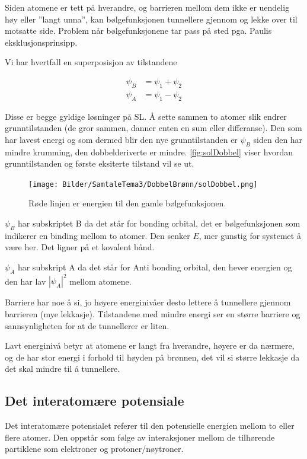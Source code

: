 Siden atomene er tett på hverandre, og barrieren mellom dem ikke er uendelig høy eller ''langt unna'', kan bølgefunksjonen tunnellere gjennom og lekke over til motsatte side. Problem når bølgefunksjonene tar pass på sted pga. Paulis eksklusjonsprinsipp.

Vi har hvertfall en superposisjon av tilstandene

\begin{equation*}
    \begin{split}
    \psi_B &= \psi_1 + \psi_2\\
    \psi_A &= \psi_1 - \psi_2
    \end{split}
\end{equation*}

Disse er begge gyldige løsninger på SL. Å sette sammen to atomer slik endrer grunntilstanden (de gror sammen, danner enten en sum eller differanse). Den som har lavest energi og som dermed blir den nye grunntilstanden er $\psi_B$ siden den har mindre krumming, den dobbelderiverte er mindre. \autoref{fig:solDobbel} viser hvordan grunntilstanden og første eksiterte tilstand vil se ut.

\begin{figure}[!htb]
    \centering
    \texttt{[image: Bilder/SamtaleTema3/DobbelBrønn/solDobbel.png]}
    \caption{Røde linjen er energien til den gamle bølgefunksjonen.}
    \label{fig:solDobbel}
\end{figure}

$\psi_B$ har subskriptet B da det står for bonding orbital, det er bølgefunksjonen som indikerer en binding mellom to atomer. Den senker $E$, mer gunstig for systemet å være her. Det ligner på et kovalent bånd.

$\psi_A$ har subskript A da det står for Anti bonding orbital, den hever energien og den har lav $|\psi_A|^2$ mellom atomene. 

Barriere har noe å si, jo høyere energinivåer desto lettere å tunnellere gjennom barrieren (mye lekkasje). Tilstandene med mindre energi ser en større barriere og sannsynligheten for at de tunnellerer er liten.

Lavt energinivå betyr at atomene er langt fra hverandre, høyere er da nærmere, og de har stor energi i forhold til høyden på brønnen, det vil si større lekkasje da det skal mindre til å tunnellere.

\subsection{Det interatomære potensiale}
\label{sec:tema3_8}
Det interatomære potensialet referer til den potensielle energien mellom to eller flere atomer. Den oppstår som følge av interaksjoner mellom de tilhørende partiklene som elektroner og protoner/nøytroner.

